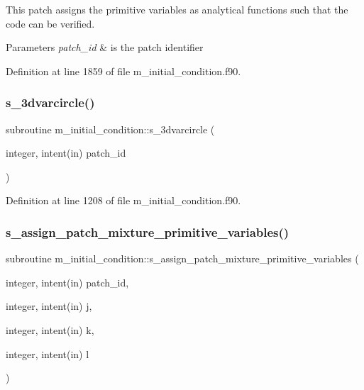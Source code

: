This patch assigns the primitive variables as analytical functions such that the code can be verified. 


\begin{DoxyParams}{Parameters}
{\em patch\+\_\+id} & is the patch identifier \\
\hline
\end{DoxyParams}


Definition at line 1859 of file m\+\_\+initial\+\_\+condition.\+f90.

\mbox{\label{namespacem__initial__condition_aea2bf07e8890b1a108f2f891609174c9}} 
\subsubsection{\texorpdfstring{s\+\_\+3dvarcircle()}{s\_3dvarcircle()}}
{\footnotesize\ttfamily subroutine m\+\_\+initial\+\_\+condition\+::s\+\_\+3dvarcircle (\begin{DoxyParamCaption}\item[{integer, intent(in)}]{patch\+\_\+id }\end{DoxyParamCaption})}



Definition at line 1208 of file m\+\_\+initial\+\_\+condition.\+f90.

\mbox{\label{namespacem__initial__condition_ac414f08eb31dad32ed313767d214df72}} 
\subsubsection{\texorpdfstring{s\+\_\+assign\+\_\+patch\+\_\+mixture\+\_\+primitive\+\_\+variables()}{s\_assign\_patch\_mixture\_primitive\_variables()}}
{\footnotesize\ttfamily subroutine m\+\_\+initial\+\_\+condition\+::s\+\_\+assign\+\_\+patch\+\_\+mixture\+\_\+primitive\+\_\+variables (\begin{DoxyParamCaption}\item[{integer, intent(in)}]{patch\+\_\+id,  }\item[{integer, intent(in)}]{j,  }\item[{integer, intent(in)}]{k,  }\item[{integer, intent(in)}]{l }\end{DoxyParamCaption})}



